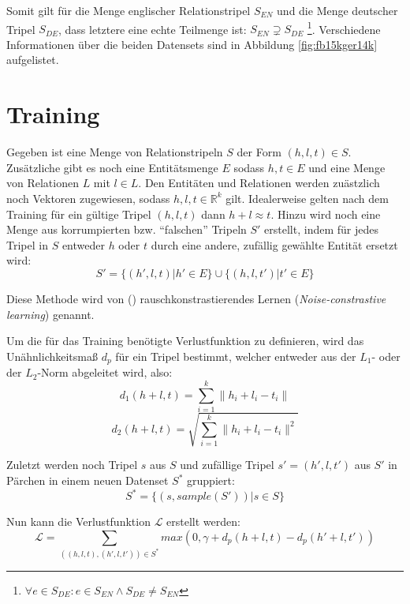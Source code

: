 Somit gilt für die Menge englischer Relationstripel $S_{EN}$ und die Menge deutscher Tripel $S_{DE}$, dass letztere
eine echte Teilmenge ist: $S_{EN} \supsetneq S_{DE}$ \footnote{$\forall e \in S_{DE}: e \in S_{EN} \wedge S_{DE} \neq S_{EN}$}.
Verschiedene Informationen über die beiden Datensets sind in Abbildung \ref{fig:fb15kger14k} aufgelistet.

\section{Training}

Gegeben ist eine Menge von Relationstripeln $S$ der Form $(h, l, t) \in S$. Zusätzliche gibt es noch eine Entitätsmenge
$E$ sodass $h, t \in E$ und eine Menge von Relationen $L$ mit $l \in L$. Den Entitäten und Relationen werden zuästzlich
noch Vektoren zugewiesen, sodass $h, l, t \in \mathbb{R}^k$ gilt. Idealerweise gelten nach dem Training für ein gültige Tripel $(h, l, t)$
dann $h + l \approx t$. Hinzu wird noch eine Menge aus korrumpierten bzw. ``falschen'' Tripeln $S'$ erstellt, indem
für jedes Tripel in $S$ entweder $h$ oder $t$ durch eine andere, zufällig gewählte Entität ersetzt wird:
\begin{equation}
  S' = \{(h', l, t) | h' \in E\} \cup \{(h, l, t') | t' \in E\}
\end{equation}

Diese Methode wird von (\cite{bordes2013translating}) rauschkonstrastierendes Lernen (\emph{Noise-constrastive learning})
genannt.

Um die für das Training benötigte Verlustfunktion zu definieren, wird das Unähnlichkeitsmaß $d_p$ für ein Tripel bestimmt, welcher
entweder aus der $L_1$- oder der $L_2$-Norm abgeleitet wird, also:
\begin{equation}
    d_1(h + l, t) = \sum_{i=1}^k \| h_i + l_i - t_i \|
\end{equation}
\begin{equation}
    d_2(h + l, t) = \sqrt{\sum_{i=1}^k \| h_i + l_i - t_i \|^2}
\end{equation}

Zuletzt werden noch Tripel $s$ aus $S$ und zufällige Tripel $s'=(h', l, t')$ aus $S'$ in Pärchen in einem neuen Datenset $S^*$ gruppiert:
\begin{equation}
  S^* = \{(s, sample(S'))| s \in S\}
\end{equation}

Nun kann die Verlustfunktion $\mathcal{L}$ erstellt werden:
\begin{equation}
  \mathcal{L} = \sum_{((h,l,t), (h', l, t')) \in S^*} max(0, \gamma + d_p(h + l, t) - d_p(h' + l, t'))
\end{equation}


